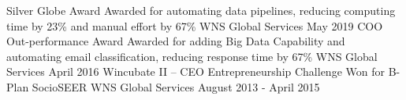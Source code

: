 \documentclass[]{awesome-cv}
\begin{document}
\vspace{-7mm}


\begin{cvhonors}
    	\cvhonor
	{Silver Globe Award}
	{Awarded for automating data pipelines, reducing computing time by 23\% and manual effort by 67\%}
	{WNS Global Services}
	{May 2019}
    	\cvhonor
	{COO Out{-}performance Award}
	{Awarded for adding Big Data Capability and automating email classification, reducing response time by 67\%}
	{WNS Global Services}
	{April 2016}
    	\cvhonor
	{Wincubate II – CEO Entrepreneurship Challenge}
	{Won for B{-}Plan SocioSEER}
	{WNS Global Services}
	{August 2013 {-} April 2015}
    \end{cvhonors}

\
\end{document}
